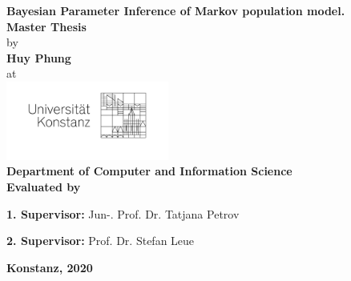 \begin{titlepage}
  \begin{center}
    {\LARGE \textbf{Bayesian Parameter Inference of Markov population model.}}
    \\[1cm]
    {\Large \textbf{Master Thesis}}
    \\[1cm]
    {\Large by}
    \\[0.5cm]
    {\LARGE \textbf{Huy Phung}}
    \\[0.5cm]
    {\Large at}
    \\[0.5cm]
    \includegraphics[width=0.4\textwidth]{figures/unisignet-klein.jpg}
    \\[1cm]
    {\Large \textbf{Department of Computer and Information Science}}
    \\[1cm]
    {\Large \textbf{Evaluated by}}
    \\[2cm]
    \begin{minipage}[c]{0.8\textwidth}
      \begin{description}[style=multiline]
      \item { \Large \textbf{1. Supervisor:} Jun-. Prof. Dr. Tatjana Petrov }
      \item { \Large \textbf{2. Supervisor:} Prof. Dr. Stefan Leue }
      \end{description}
    \end{minipage}
    \vfill
    {\LARGE \textbf{Konstanz, 2020}}
  \end{center}
\end{titlepage}
